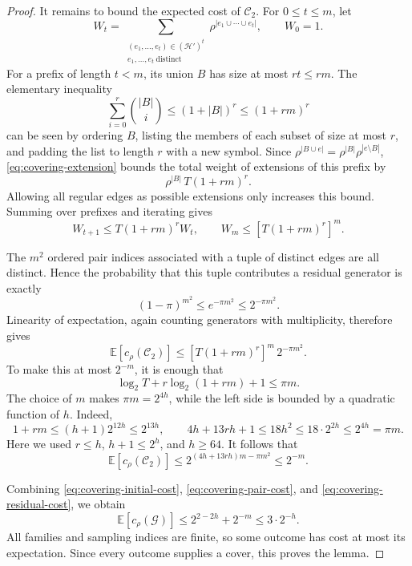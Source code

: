 \begin{proof}
It remains to bound the expected cost of \(\mathcal C_2\). For
\(0\le t\le m\), let
\[
W_t=
\sum_{\substack{(e_1,\ldots,e_t)\in(\mathcal H')^t\\
                e_1,\ldots,e_t\ \text{distinct}}}
  \rho^{|e_1\cup\cdots\cup e_t|},
\qquad W_0=1.
\]
For a prefix of length \(t<m\), its union \(B\) has size at most \(rt\le rm\).
The elementary inequality
\[
\sum_{i=0}^r\binom{|B|}{i}\le(1+|B|)^r\le(1+rm)^r
\]
can be seen by ordering \(B\), listing the members of each subset of size
at most \(r\), and padding the list to length \(r\) with a new symbol.
Since
\(\rho^{|B\cup e|}=\rho^{|B|}\rho^{|e\setminus B|}\),
\eqref{eq:covering-extension} bounds the total weight of extensions of
this prefix by
\[
\rho^{|B|}\,T(1+rm)^r.
\]
Allowing all regular edges as possible extensions only increases this
bound. Summing over prefixes and iterating gives
\[
W_{t+1}\le T(1+rm)^rW_t,
\qquad
W_m\le[T(1+rm)^r]^m.
\]

The \(m^2\) ordered pair indices associated with a tuple of distinct
edges are all distinct. Hence the probability that this tuple contributes
a residual generator is exactly
\[
(1-\pi)^{m^2}\le e^{-\pi m^2}\le2^{-\pi m^2}.
\]
Linearity of expectation, again counting generators with multiplicity,
therefore gives
\[
\mathbb E[c_\rho(\mathcal C_2)]
\le[T(1+rm)^r]^m\,2^{-\pi m^2}.
\]
To make this at most \(2^{-m}\), it is enough that
\[
\log_2 T+r\log_2(1+rm)+1\le\pi m.
\]
The choice of \(m\) makes \(\pi m=2^{4h}\), while the left side
is bounded by a quadratic function of \(h\). Indeed,
\[
1+rm\le(h+1)2^{12h}\le2^{13h},
\qquad
4h+13rh+1\le18h^2
\le18\cdot2^{2h}\le2^{4h}=\pi m.
\]
Here we used \(r\le h\), \(h+1\le2^h\), and \(h\ge64\).
It follows that
\begin{equation}\label{eq:covering-residual-cost}
\mathbb E[c_\rho(\mathcal C_2)]
\le2^{(4h+13rh)m-\pi m^2}\le2^{-m}.
\end{equation}

Combining \eqref{eq:covering-initial-cost},
\eqref{eq:covering-pair-cost}, and
\eqref{eq:covering-residual-cost}, we obtain
\[
\mathbb E[c_\rho(\mathcal G)]
\le2^{2-2h}+2^{-m}\le3\cdot2^{-h}.
\]
All families and sampling indices are finite, so some outcome has cost
at most its expectation. Since every outcome supplies a cover, this proves
the lemma.
\end{proof}
